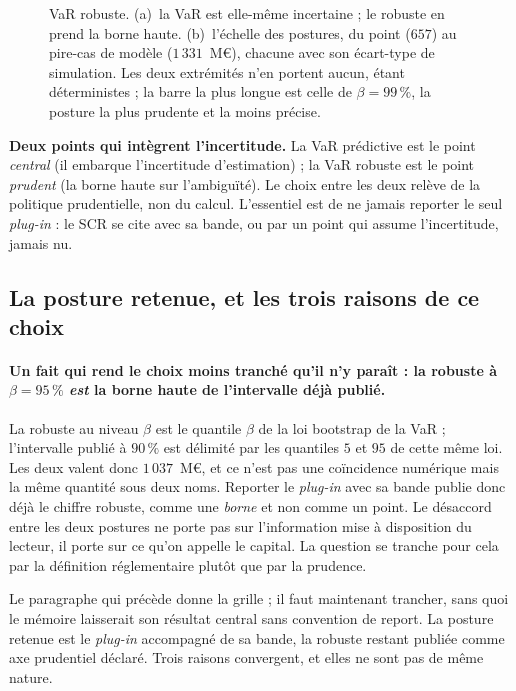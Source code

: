 \begin{figure}[htbp]\centering
{}
\caption{VaR robuste. (a)~la VaR est elle-même incertaine ; le robuste en prend la
borne haute. (b)~l'échelle des postures, du point ($657$) au pire-cas de modèle
($1\,331$~M\euro), chacune avec son écart-type de simulation. Les deux extrémités n'en
portent aucun, étant déterministes ; la barre la plus longue est celle de $\beta=99\,\%$, la
posture la plus prudente et la moins précise.}
\label{fig:robuste}
\end{figure}

\begin{cle}
\textbf{Deux points qui intègrent l'incertitude.} La VaR prédictive est le point
\emph{central} (il embarque l'incertitude d'estimation) ; la VaR robuste est le point
\emph{prudent} (la borne haute sur l'ambiguïté). Le choix entre les deux relève de la politique
prudentielle, non du calcul. L'essentiel est de ne jamais reporter le seul \emph{plug-in} : le
SCR se cite avec sa bande, ou par un point qui assume l'incertitude, jamais nu.
\end{cle}

\subsection*{La posture retenue, et les trois raisons de ce choix}
\label{sec:posture-retenue}


\paragraph{Un fait qui rend le choix moins tranché qu'il n'y paraît : la robuste à
$\beta=95\,\%$ \emph{est} la borne haute de l'intervalle déjà publié.} La robuste au niveau
$\beta$ est le quantile $\beta$ de la loi bootstrap de la VaR ; l'intervalle publié à $90\,\%$ est
délimité par les quantiles $5$ et $95$ de cette même loi. Les deux valent donc $1\,037$~M\euro{},
et ce n'est pas une coïncidence numérique mais la même quantité sous deux noms. Reporter le
\emph{plug-in} avec sa bande publie donc déjà le chiffre robuste, comme une \emph{borne} et non
comme un point. Le désaccord entre les deux postures ne porte pas sur l'information mise à
disposition du lecteur, il porte sur ce qu'on appelle \og le \fg{} capital. La question se tranche
pour cela par la définition réglementaire plutôt que par la prudence.

Le paragraphe qui précède donne la grille ; il faut maintenant trancher, sans quoi le mémoire
laisserait son résultat central sans convention de report. La posture retenue est le
\emph{plug-in} accompagné de sa bande, la robuste restant publiée comme axe prudentiel déclaré.
Trois raisons convergent, et elles ne sont pas de même nature.

